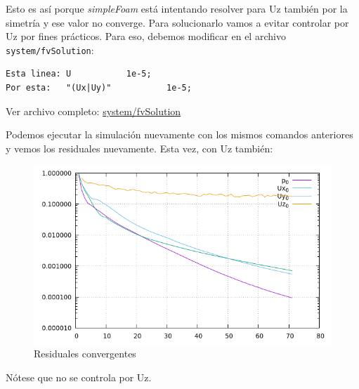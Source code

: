 \documentclass{article}
\begin{document}
Esto es así porque \textit{simpleFoam} está intentando resolver para Uz también por la simetría y ese valor no converge.
Para solucionarlo vamos a evitar controlar por Uz por fines prácticos. Para eso, debemos modificar en el archivo \texttt{system/fvSolution}:
\begin{lstlisting}
Esta linea: U			1e-5;
Por esta:   "(Ux|Uy)"           1e-5;
\end{lstlisting}

\noindent Ver archivo completo: \href{https://github.com/guillerolle/casos_cfd/blob/master/02/system/fvSolution}{system/fvSolution}

\newpage
Podemos ejecutar la simulación nuevamente con los mismos comandos anteriores y vemos los residuales nuevamente. Esta vez, con Uz también:

\begin{figure}[h!]
	\centering
	\includegraphics[width=1\textwidth]{Figuras/04_residuales_siconv.png}
	\caption{Residuales convergentes}
	\label{fig:resid_siconv}
\end{figure}

Nótese que no se controla por Uz.
\end{document}
